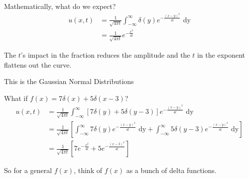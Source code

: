 \documentclass{article}
\begin{document}
Mathematically, what do we expect?
%
\begin{align}
  u(x, t) & = \frac{1}{\sqrt{4 \pi t}} \int^\infty_{-\infty} \delta(y) e^{- \frac{(x - y)^2}{4t}} \text{ dy}\\
  & = \frac{1}{\sqrt{4 \pi t}} e^{- \frac{x^2}{4 t}}
\end{align}

The $t$'s impact in the fraction reduces the amplitude and the $t$ in the exponent flattens out the curve.

This is the Gaussian Normal Distributions

What if $f(x) = 7 \delta(x) + 5 \delta(x - 3)$?
%
\begin{align}
  u(x, t) & = \frac{1}{\sqrt{4 \pi t}} \int^\infty_{-\infty} [7 \delta(y) + 5 \delta(y - 3)] e^{-\frac{(x - y)^2}{4 t}} \text{ dy}\\
  & = \frac{1}{\sqrt{4 \pi t}}
  \left[
    \int^\infty_{-\infty} 7 \delta(y) e^{- \frac{(x - y)^2}{4 t}} \text{ dy} +
    \int^\infty_{-\infty} 5 \delta(y - 3) e^{-\frac{(x - y)^2}{4t}} \text{ dy}
  \right]\\
  & = \frac{1}{\sqrt{4 \pi t}}
  \left[
    7e^{- \frac{x^2}{4 t}} + 5 e^{-\frac{(x - 3)^2}{4 t}}
  \right]
\end{align}

So for a general $f(x)$, think of $f(x)$ as a bunch of delta functions.
\end{document}
